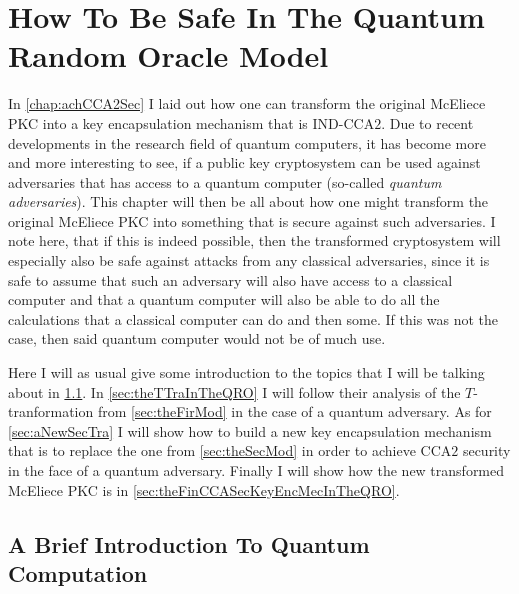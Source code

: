 
\chapter{How To Be Safe In The Quantum Random Oracle Model}
\label{chap:betSecInTheQuaRanOraMod}

In \cref{chap:achCCA2Sec} I laid out how one can transform the original McEliece PKC into a key encapsulation mechanism that is IND-$\mathrm{CCA}2$. Due to recent developments in the research field of quantum computers, it has become more and more interesting to see, if a public key cryptosystem can be used against adversaries that has access to a quantum computer (so-called \emph{quantum adversaries}). This chapter will then be all about how one might transform the original McEliece PKC into something that is secure against such adversaries. I note here, that if this is indeed possible, then the transformed cryptosystem will especially also be safe against attacks from any classical adversaries, since it is safe to assume that such an adversary will also have access to a classical computer and that a quantum computer will also be able to do all the calculations that a classical computer can do and then some. If this was not the case, then said quantum computer would not be of much use.

Here I will as usual give some introduction to the topics that I will be talking about in \cref{sec:quaCom}. In \cref{sec:theTTraInTheQRO} I will follow their analysis of the $T$-tranformation from \cref{sec:theFirMod} in the case of a quantum adversary. As for \cref{sec:aNewSecTra} I will show how to build a new key encapsulation mechanism that is to replace the one from \cref{sec:theSecMod} in order to achieve $\mathrm{CCA}2$ security in the face of a quantum adversary. Finally I will show how the new transformed McEliece PKC is in \cref{sec:theFinCCASecKeyEncMecInTheQRO}.



\section{A Brief Introduction To Quantum Computation}
\label{sec:quaCom}

